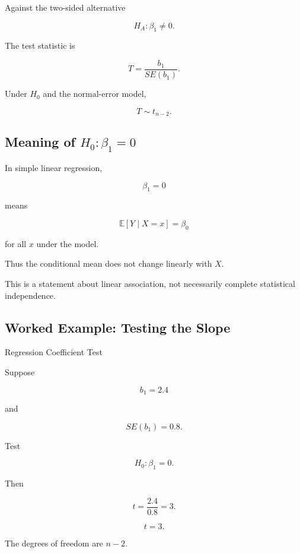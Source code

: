 Against the two-sided alternative

\[
\boxed{
H_A:\beta_1\neq0.
}
\]

The test statistic is

\[
\boxed{
T
=
\frac{
b_1
}{
SE(b_1)
}.
}
\]

Under \(H_0\) and the normal-error model,

\[
\boxed{
T\sim t_{n-2}.
}
\]

\subsection{Meaning of \(H_0:\beta_1=0\)}
\label{subsec:meaning-zero-slope}

In simple linear regression,

\[
\beta_1=0
\]

means

\[
\boxed{
\mathbb{E}[Y\mid X=x]
=
\beta_0
}
\]

for all \(x\) under the model.

Thus the conditional mean does not change linearly with \(X\).

This is a statement about linear association, not necessarily complete
statistical independence.

\subsection{Worked Example: Testing the Slope}
\label{subsec:worked-testing-slope}

\begin{workedexamplebox}{Regression Coefficient Test}

Suppose

\[
b_1=2.4
\]

and

\[
SE(b_1)=0.8.
\]

Test

\[
H_0:\beta_1=0.
\]

Then

\[
t
=
\frac{2.4}{0.8}
=
3.
\]

\begin{answerbox}
\[
\boxed{
t=3.
}
\]
\end{answerbox}

The degrees of freedom are \(n-2\).

\end{workedexamplebox}

